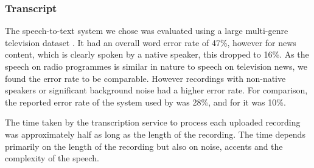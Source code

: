 \subsubsection{Transcript}\label{sec:transcript}
The speech-to-text system we chose was evaluated using a large multi-genre television dataset \citep{Bell2015}.  It had
an overall word error rate of 47\%, however for news content, which is clearly spoken by a native speaker, this dropped
to 16\%. As the speech on radio programmes is similar in nature to speech on television news, we found the error rate
to be comparable. However recordings with non-native speakers or significant background noise had a higher error rate.
For comparison, the reported error rate of the system used by \citet{Whittaker2004} was 28\%, and for
\citet{Sivaraman2016} it was 10\%.

The time taken by the transcription service to process each uploaded recording
was approximately half as long as the length of the recording. The time
depends primarily on the length of the recording but also on noise, accents and the complexity of the speech.





